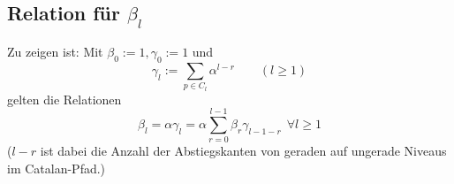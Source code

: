 \documentclass[a4paper, 11pt]{scrreprt}
\begin{document}

\subsection*{Relation für $ \beta_l $}
Zu zeigen ist: Mit \(\beta_0 :=1, \gamma_0:=1 \) und
\begin{equation*}
		\gamma_l:=\sum_{p\in C_l} \alpha^{l-r} \qquad (l\geq 1)
\end{equation*}
gelten die Relationen
\begin{equation}
	\beta_l = \alpha\gamma_l=\alpha\sum_{r=0}^{l-1}\beta_r \gamma_{l-1-r} ~~\forall l \geq 1
\end{equation}
(\(l-r\) ist dabei die Anzahl der Abstiegskanten von geraden auf ungerade Niveaus im Catalan-Pfad.)
\begin{itemize}

\end{itemize}
\end{document}
